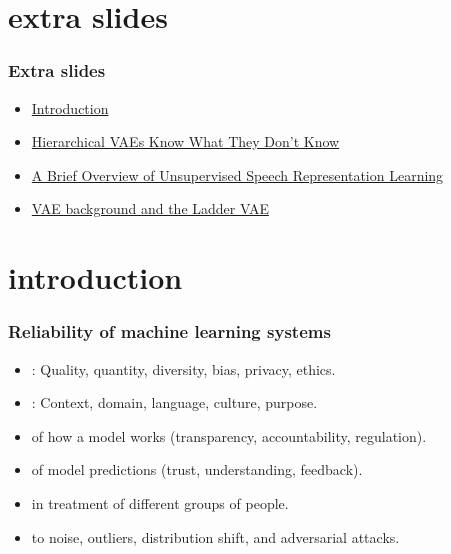 
\section[Extra Slides]{extra slides}

\begin{frame}
    \frametitle{Extra slides}
    \begin{itemize}
        \item \hyperlink{extra:introduction}{Introduction}
        \item \hyperlink{extra:hierarchical}{Hierarchical VAEs Know What They Don't Know}
        \item \hyperlink{extra:brief}{A Brief Overview of Unsupervised Speech Representation Learning}
        \item \hyperlink{extra:ladder-vae}{VAE background and the Ladder VAE}
    \end{itemize}
\end{frame}


\section[Introduction]{introduction}\label{extra:introduction}


\begin{frame}
    \frametitle{Reliability of machine learning systems}
    \begin{itemize}
        \item <1-> : Quality, quantity, diversity, bias, privacy, ethics.
        \item <1-> : Context, domain, language, culture, purpose.
        \vspace{1em}
        \item <2->  of how a model works (transparency, accountability, regulation).
        \item <2->  of model predictions (trust, understanding, feedback).
        \item <2->  in treatment of different groups of people.
        \item <2->  to noise, outliers, distribution shift, and adversarial attacks.
    \end{itemize}

\end{frame}


